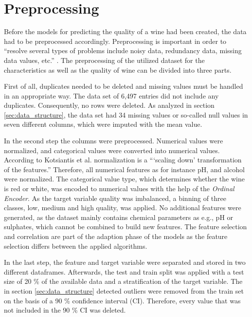 \section{Preprocessing}\label{chap:preprocessing}
Before the models for predicting the quality of a wine had been created, the data had to be preprocessed accordingly. Preprocessing is important in order to \enquote{resolve several types of problems include noisy data, redundancy data, missing data values, etc.} \citep[p. 116]{Kotsiantis2006}. The preprocessing of the utilized dataset for the characteristics as well as the quality of wine can be divided into three parts.

First of all, duplicates needed to be deleted and missing values must be handled in an appropriate way. The data set of 6,497 entries did not include any duplicates. Consequently, no rows were deleted. As analyzed in section \ref{sec:data_structure}, the data set had 34 missing values or so-called null values in seven different columns, which were imputed with the mean value.

In the second step the columns were preprocessed. Numerical values were normalized, and categorical values were converted into numerical values. According to Kotsiantis et al. normalization is a \enquote{\enquote{scaling down} transformation of the features.} \citep[p. 113]{Kotsiantis2006} Therefore, all numerical features as for instance pH, and alcohol were normalized. The categorical value type, which determines whether the wine is red or white, was encoded to numerical values with the help of the \textit{Ordinal Encoder}. \citep{OrdinalEncoder2021} As the target variable quality was imbalanced, a binning of three classes, low, medium and high quality, was applied. No additional features were generated, as the dataset mainly contains chemical parameters as e.g., pH or sulphates, which cannot be combined to build new features. The feature selection and correlation are part of the adaption phase of the models as the feature selection differs between the applied algorithms.

In the last step, the feature and target variable were separated and stored in two different dataframes. Afterwards, the test and train split was applied with a test size of 20 \% of the available data and a stratification of the target variable. The in section \ref{sec:data_structure} detected outliers were removed from the train set on the basis of a 90 \% confidence interval (CI). \citep{AskPython2021} Therefore, every value that was not included in the 90 \% CI was deleted.




